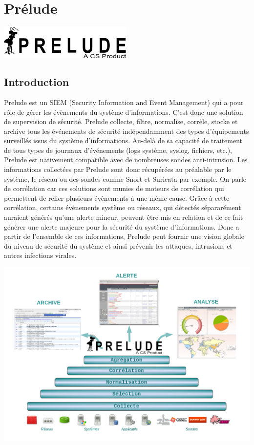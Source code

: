 \documentclass[a4paper,11pt,french]{article}
\begin{document}
\newpage
\section{Prélude}

\begin{center}\includegraphics{icons/prelude-logo.png}\end{center}

\subsection{Introduction}
Prelude est un SIEM (Security Information and Event Management) qui a pour rôle de gérer les évènements du système d’informations. C’est donc une solution de supervision de sécurité. Prelude collecte, filtre, normalise, corrèle, stocke et archive tous les événements de sécurité indépendamment des types d’équipements surveillés issus du système d'informations. Au-delà de sa capacité de traitement de tous types de journaux d’événements (logs système, syslog, fichiers, etc.), Prelude est nativement compatible avec de nombreuses sondes anti-intrusion. Les informations collectées par Prelude sont donc récupérées au préalable par le système, le réseau ou des sondes comme Snort et Suricata par exemple. 
On parle de corrélation car ces solutions sont munies de moteurs de corrélation qui permettent de relier plusieurs évènements à une même cause. Grâce à cette corrélation, certains évènements système ou réseaux, qui détectés sépararément auraient générés qu’une alerte mineur, peuvent être mis en relation et de ce fait générer une alerte majeure pour la sécurité du système d’informations.
Donc a partir de l'ensemble de ces informations, Prelude peut fournir une vision globale du niveau de sécurité du système et ainsi prévenir les attaques, intrusions et autres infections virales. 

\begin{center}\includegraphics[width=17cm]{icons/Prelude-Archi-Market-2a.png}\end{center}
\end{document}
